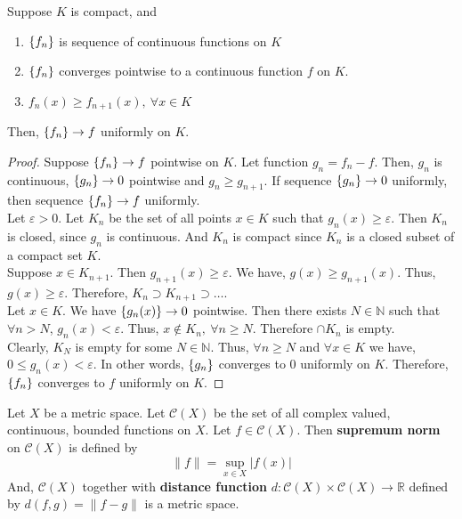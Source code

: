 \begin{theorem} %
	Suppose $K$ is compact, and
	\begin{enumerate}
		\item $\left\{f_n\right\}$ is sequence of continuous functions on $K$
		\item $\left\{f_n\right\}$ converges pointwise to a continuous function $f$ on $K$.
		\item $f_n(x) \ge f_{n+1}(x),\ \forall x \in K$
	\end{enumerate}
	Then, $\left\{f_n\right\} \to f$ uniformly on $K$.
\end{theorem}
\begin{proof}
	Suppose $\left\{f_n\right\} \to f$ pointwise on $K$.
	Let function $g_n = f_n - f$.
	Then, $g_n$ is continuous, $\left\{g_n\right\} \to 0$ pointwise and $g_n \ge g_{n+1}$.
  	If sequence $\left\{g_n\right\} \to 0$ uniformly, then sequence $\left\{f_n\right\} \to f$ uniformly.\\

	Let $\varepsilon > 0$.
	Let $K_n$ be the set of all points $x \in K$ such that $g_n(x) \ge \varepsilon$.
	Then $K_n$ is closed, since $g_n$ is continuous.
	And $K_n$ is compact since $K_n$ is a closed subset of a compact set $K$.\\

	Suppose $x \in K_{n+1}$.
	Then $g_{n+1}(x) \ge \varepsilon$.
	We have, $g(x) \ge g_{n+1}(x)$.
	Thus, $g(x) \ge \varepsilon$.
	Therefore, $K_n \supset K_{n+1} \supset \dots$.\\

	Let $x \in K$.
	We have $\left\{g_n(x)\right\} \to 0$ pointwise.
	Then there exists $N \in \mathbb{N}$ such that $\forall n > N$, $g_n(x) < \varepsilon$.
	Thus, $x \notin K_n,\ \forall n \ge N$.
	Therefore $\cap K_n$ is empty.\\

	Clearly, $K_N$ is empty for some $N \in \mathbb{N}$.
	Thus, $\forall n \ge N$ and $\forall x \in K$ we have, $0 \le g_n(x) < \varepsilon$.
	In other words, $\left\{g_n\right\}$ converges to $0$ uniformly on $K$.
	Therefore, $\left\{f_n\right\}$ converges to $f$ uniformly on $K$.
\end{proof}

\begin{definition} %
	Let $X$ be a metric space.
	Let $\mathscr{C}(X)$ be the set of all complex valued, continuous, bounded functions on $X$.
	Let $f \in \mathscr{C}(X)$.
	Then \textbf{supremum norm} on $\mathscr{C}(X)$ is defined by
	\[ \| f \| = \sup_{x \in X} |f(x)| \]
	And, $\mathscr{C}(X)$ together with \textbf{distance function} $d : \mathscr{C}(X) \times \mathscr{C}(X) \to \mathbb{R}$ defined by $d(f,g) = \| f-g \|$ is a metric space.
\end{definition}


